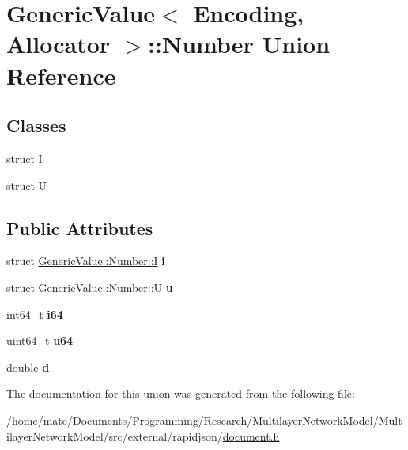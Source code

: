 \hypertarget{unionGenericValue_1_1Number}{}\section{Generic\+Value$<$ Encoding, Allocator $>$\+:\+:Number Union Reference}
\label{unionGenericValue_1_1Number}
\subsection*{Classes}
\begin{DoxyCompactItemize}
\item 
struct \hyperlink{structGenericValue_1_1Number_1_1I}{I}
\item 
struct \hyperlink{structGenericValue_1_1Number_1_1U}{U}
\end{DoxyCompactItemize}
\subsection*{Public Attributes}
\begin{DoxyCompactItemize}
\item 
struct \hyperlink{structGenericValue_1_1Number_1_1I}{Generic\+Value\+::\+Number\+::I} {\bfseries i}\hypertarget{unionGenericValue_1_1Number_a0593fffc72a240979606668179e94436}{}\label{unionGenericValue_1_1Number_a0593fffc72a240979606668179e94436}

\item 
struct \hyperlink{structGenericValue_1_1Number_1_1U}{Generic\+Value\+::\+Number\+::U} {\bfseries u}\hypertarget{unionGenericValue_1_1Number_a3b5f0986718c830b88d641491248131d}{}\label{unionGenericValue_1_1Number_a3b5f0986718c830b88d641491248131d}

\item 
int64\+\_\+t {\bfseries i64}\hypertarget{unionGenericValue_1_1Number_ae53d96a8ead92099541da3b71633b77b}{}\label{unionGenericValue_1_1Number_ae53d96a8ead92099541da3b71633b77b}

\item 
uint64\+\_\+t {\bfseries u64}\hypertarget{unionGenericValue_1_1Number_a1c8d3c6d226cf74315e233b30b622430}{}\label{unionGenericValue_1_1Number_a1c8d3c6d226cf74315e233b30b622430}

\item 
double {\bfseries d}\hypertarget{unionGenericValue_1_1Number_a7ca3ad492fff303586d241eb0d17c242}{}\label{unionGenericValue_1_1Number_a7ca3ad492fff303586d241eb0d17c242}

\end{DoxyCompactItemize}


The documentation for this union was generated from the following file\+:\begin{DoxyCompactItemize}
\item 
/home/mate/\+Documents/\+Programming/\+Research/\+Multilayer\+Network\+Model/\+Multilayer\+Network\+Model/src/external/rapidjson/\hyperlink{document_8h}{document.\+h}\end{DoxyCompactItemize}
